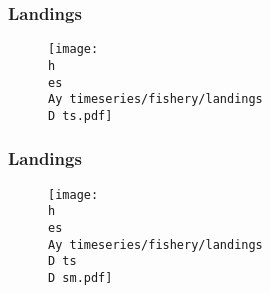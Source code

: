 \documentclass{beamer}
\newcommand{\D}{.} %
\newcommand{\h}{C:/} %
\newcommand{\es}{bio.data/bio.snowcrab/}
\newcommand{\Ay}{assessments/2017/}
\begin{document}


\begin{frame}
\frametitle{Landings}


\begin{figure}
	
	\vspace*{-0.25cm}
	\centerline{\texttt{[image: \\h \\es \\Ay timeseries/fishery/landings\\D ts.pdf]}}
	
\end{figure}

\end{frame}


\begin{frame}
\frametitle{Landings}

\begin{figure}
	
	\vspace*{-0.25cm}
	\centerline{\texttt{[image: \\h \\es \\Ay timeseries/fishery/landings\\D ts\\D sm.pdf]}}
	
\end{figure}

\end{frame}
\end{document}
